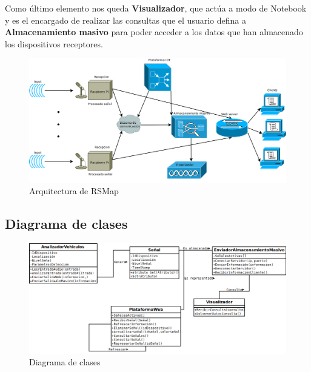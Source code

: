 Como último elemento nos queda \textbf{Visualizador}, que actúa a modo de Notebook y es el encargado de realizar las consultas que el usuario defina a \textbf{Almacenamiento masivo} para poder acceder a los datos que han almacenado los dispositivos receptores.

\begin{figure}[!ht]
  \begin{center}
  \includegraphics[scale=0.35]{../images/diag_plan/diag_arqu.png}
  \caption{Arquitectura de RSMap}
  \label{fig:ar_rsmap}
  \end{center}
\end{figure}

\newpage

\subsection{Diagrama de clases}

\begin{figure}[!ht]
  \begin{center}
  \includegraphics[scale=0.60, angle=90]{../images/diag_plan/clases.png}
  \caption{Diagrama de clases}
  \label{fig:ar_rsmap}
  \end{center}
\end{figure}

\newpage

